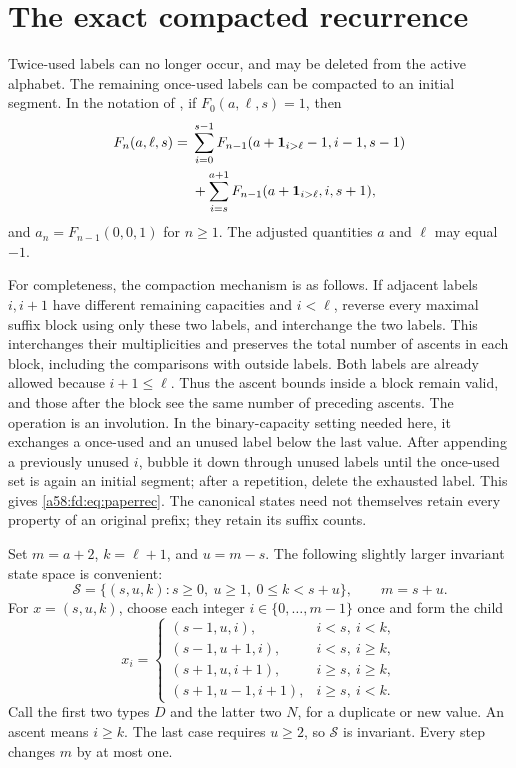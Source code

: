 \documentclass[11pt,letterpaper]{article}
\theoremstyle{remark}
\newcommand{\one}{\mathbf 1}
\begin{document}
\section{The exact compacted recurrence}\label{a58:fd:sec:recurrence}
Twice-used labels can no longer occur, and may be deleted from the active alphabet. The remaining once-used labels can be compacted to an initial segment. In the notation of \cite[Sections 2.2 and 2.6]{CCEG}, if $F_0(a,\ell,s)=1$, then
\begin{align}\label{a58:fd:eq:paperrec}
F_n(a,\ell,s)={}&\sum_{i=0}^{s-1}
 F_{n-1}(a+\one_{i>\ell}-1,i-1,s-1)\notag\\
&+\sum_{i=s}^{a+1}F_{n-1}(a+\one_{i>\ell},i,s+1),
\end{align}
and $a_n=F_{n-1}(0,0,1)$ for $n\ge1$. The adjusted quantities $a$ and $\ell$ may equal $-1$.

For completeness, the compaction mechanism is as follows. If adjacent labels $i,i+1$ have different remaining capacities and $i<\ell$, reverse every maximal suffix block using only these two labels, and interchange the two labels. This interchanges their multiplicities and preserves the total number of ascents in each block, including the comparisons with outside labels. Both labels are already allowed because $i+1\le\ell$. Thus the ascent bounds inside a block remain valid, and those after the block see the same number of preceding ascents. The operation is an involution. In the binary-capacity setting needed here, it exchanges a once-used and an unused label below the last value. After appending a previously unused $i$, bubble it down through unused labels until the once-used set is again an initial segment; after a repetition, delete the exhausted label. This gives \eqref{a58:fd:eq:paperrec}. The canonical states need not themselves retain every property of an original prefix; they retain its suffix counts.

Set $m=a+2$, $k=\ell+1$, and $u=m-s$. The following slightly larger invariant state space is convenient:
\[
 \mathcal S=\{(s,u,k):s\ge0,\ u\ge1,\ 0\le k<s+u\},\qquad m=s+u.
\]
For $x=(s,u,k)$, choose each integer $i\in\{0,\ldots,m-1\}$ once and form the child
\begin{equation}\label{a58:fd:eq:children}
 x_i=\begin{cases}
 (s-1,u,i),&i<s,\ i<k,\\
 (s-1,u+1,i),&i<s,\ i\ge k,\\
 (s+1,u,i+1),&i\ge s,\ i\ge k,\\
 (s+1,u-1,i+1),&i\ge s,\ i<k.
 \end{cases}
\end{equation}
Call the first two types $D$ and the latter two $N$, for a duplicate or new value. An ascent means $i\ge k$. The last case requires $u\ge2$, so $\mathcal S$ is invariant. Every step changes $m$ by at most one.
\end{document}
